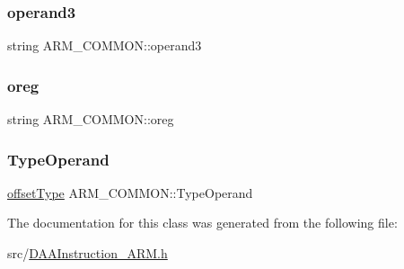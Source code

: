 \subsubsection{\texorpdfstring{operand3}{operand3}}
{\footnotesize\ttfamily string A\+R\+M\+\_\+\+C\+O\+M\+M\+O\+N\+::operand3\hspace{0.3cm}{\ttfamily [protected]}}

\mbox{\label{classARM__COMMON_a6af2d514cf260ca734b75a621003def7}} 
\subsubsection{\texorpdfstring{oreg}{oreg}}
{\footnotesize\ttfamily string A\+R\+M\+\_\+\+C\+O\+M\+M\+O\+N\+::oreg\hspace{0.3cm}{\ttfamily [protected]}}

\mbox{\label{classARM__COMMON_a6bef177d4e532499ed708243c9bec81a}} 
\subsubsection{\texorpdfstring{Type\+Operand}{TypeOperand}}
{\footnotesize\ttfamily \hyperlink{arch_8h_a63b66e201ffc27bbc8f89c8808382044}{offset\+Type} A\+R\+M\+\_\+\+C\+O\+M\+M\+O\+N\+::\+Type\+Operand\hspace{0.3cm}{\ttfamily [protected]}}



The documentation for this class was generated from the following file\+:\begin{DoxyCompactItemize}
\item 
src/\hyperlink{DAAInstruction__ARM_8h}{D\+A\+A\+Instruction\+\_\+\+A\+R\+M.\+h}\end{DoxyCompactItemize}
